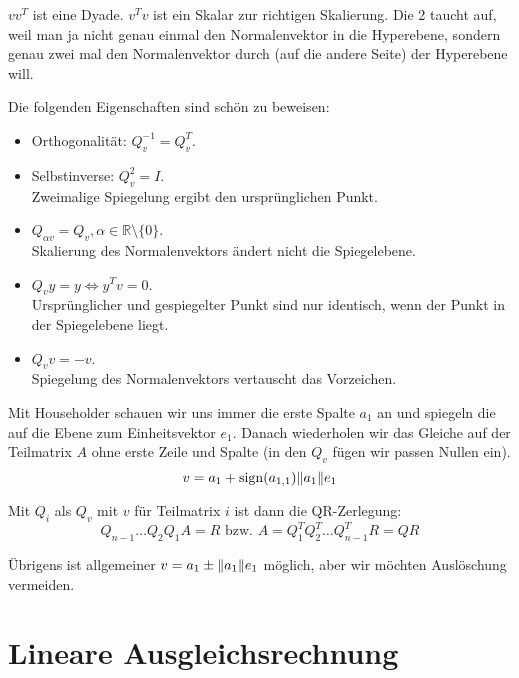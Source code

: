 \documentclass[a4paper,parskip=half*,DIV=15,fontsize=11pt]{scrartcl}
\DeclarePairedDelimiter\norm{\lVert}{\rVert}
\DeclareMathOperator\sign{sign}
\begin{document}
$v v^T$ ist eine Dyade. $v^T v$ ist ein Skalar zur richtigen Skalierung. Die 2 taucht auf, weil man ja nicht genau einmal den Normalenvektor in die Hyperebene, sondern genau zwei mal den Normalenvektor durch (auf die andere Seite) der Hyperebene will.

Die folgenden Eigenschaften sind schön zu beweisen:

\begin{minipage}[t]{0.5\textwidth}
\begin{itemize}
  \item Orthogonalität: $Q_v^{-1} = Q_v^T$.
  \item Selbstinverse: $Q_v^2 = I$.\\Zweimalige Spiegelung ergibt den ursprünglichen Punkt.
  \item $Q_{\alpha v} = Q_v, \alpha \in \mathbb{R} \setminus \{0\}$.\\Skalierung des Normalenvektors ändert nicht die Spiegelebene.
\end{itemize}
\end{minipage}
\begin{minipage}[t]{0.5\textwidth}
\begin{itemize}
  \item $Q_v y = y \Leftrightarrow y^T v = 0$.\\
        Ursprünglicher und gespiegelter Punkt sind nur identisch, wenn der Punkt in der Spiegelebene liegt.
  \item $Q_v v = -v$.\\
        Spiegelung des Normalenvektors vertauscht das Vorzeichen.
\end{itemize}
\end{minipage}

Mit Householder schauen wir uns immer die erste Spalte $a_1$ an und spiegeln die auf die Ebene zum Einheitsvektor $e_1$. Danach wiederholen wir das Gleiche auf der Teilmatrix $A$ ohne erste Zeile und Spalte (in den $Q_v$ fügen wir passen Nullen ein).
\[v = a_1 + \sign(a_{1,1}) \norm{a_1} e_1\]

Mit $Q_i$ als $Q_v$ mit $v$ für Teilmatrix $i$ ist dann die QR-Zerlegung:
\[Q_{n-1} \ldots Q_2 Q_1 A = R \text{ bzw. } A = Q_1^T Q_2^T \ldots Q_{n-1}^T R = QR\]

Übrigens ist allgemeiner $v = a_1 \pm \norm{a_1} e_1$ möglich, aber wir möchten Auslöschung vermeiden.

\section{Lineare Ausgleichsrechnung}
\end{document}
